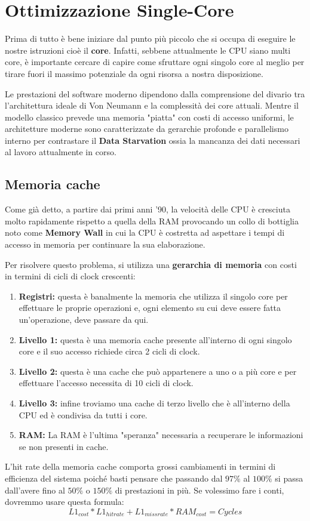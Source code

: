 \chapter{Ottimizzazione Single-Core}
Prima di tutto è bene iniziare dal punto più piccolo che si occupa di eseguire le nostre istruzioni cioè il \textbf{core}. Infatti, sebbene attualmente le CPU siano multi core, è importante cercare di capire come sfruttare ogni singolo core al meglio per tirare fuori il massimo potenziale da ogni risorsa a nostra disposizione.

Le prestazioni del software moderno dipendono dalla comprensione del divario tra l'architettura ideale di Von Neumann e la complessità dei core attuali. Mentre il modello classico prevede una memoria "piatta" con costi di accesso uniformi, le architetture moderne sono caratterizzate da gerarchie profonde e parallelismo interno per contrastare il \textbf{Data Starvation} ossia la mancanza dei dati necessari al lavoro attualmente in corso.


\section{Memoria cache}
Come già detto, a partire dai primi anni '90, la velocità delle CPU è cresciuta molto rapidamente rispetto a quella della RAM provocando un collo di bottiglia noto come \textbf{Memory Wall} in cui la CPU è costretta ad aspettare i tempi di accesso in memoria per continuare la sua elaborazione.

Per risolvere questo problema, si utilizza una \textbf{gerarchia di memoria } con costi in termini di cicli di clock crescenti:
\begin{enumerate}
    \item \textbf{Registri:} questa è banalmente la memoria che utilizza il singolo core per effettuare le proprie operazioni e, ogni elemento su cui deve essere fatta un'operazione, deve passare da qui.
    \item \textbf{Livello 1:} questa è una memoria cache presente all'interno di ogni singolo core e il suo accesso richiede circa 2 cicli di clock.
    \item \textbf{Livello 2:} questa è una cache che può appartenere a uno o a più core e per effettuare l'accesso necessita di 10 cicli di clock.
    \item \textbf{Livello 3:} infine troviamo una cache di terzo livello che è all'interno della CPU ed è condivisa da tutti i core.
    \item \textbf{RAM:} La RAM è l'ultima "speranza" necessaria a recuperare le informazioni se non presenti in cache.
\end{enumerate}
L'hit rate della memoria cache comporta grossi cambiamenti in termini di efficienza del sistema poiché basti pensare che passando dal $97\%$ al $100\%$ si passa dall'avere fino al $50\%$ o $150\%$ di prestazioni in più. Se volessimo fare i conti, dovremmo usare questa formula:
\[L1_{cost} * L1_{hit rate} + L1_{miss rate} * RAM_{cost} = Cycles\]

